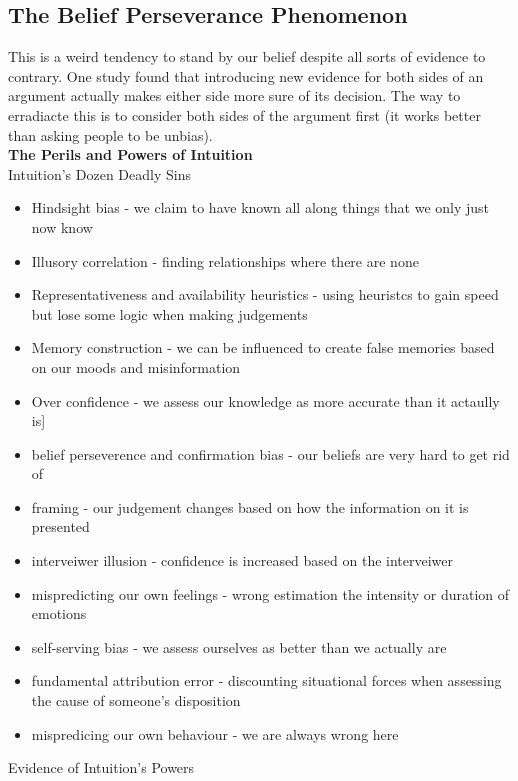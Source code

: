 \documentclass[12pt]{article}
\begin{document}
\subsection*{The Belief Perseverance Phenomenon} This is a weird tendency to stand by our belief despite all sorts of evidence to contrary. One study found that introducing new evidence for both sides of an argument actually makes either side more sure of its decision. The way to erradiacte this is to consider both sides of the argument first (it works better than asking people to be unbias).\\
\textbf{The Perils and Powers of Intuition} \\
Intuition's Dozen Deadly Sins
\begin{itemize}
\item Hindsight bias - we claim to have known all along things that we only just now know
\item Illusory correlation - finding relationships where there are none
\item Representativeness and availability heuristics - using heuristcs to gain speed but lose some logic when making judgements
\item Memory construction - we can be influenced to create false memories based on our moods and misinformation
\item Over confidence - we assess our knowledge as more accurate than it actaully is]
\item belief perseverence and confirmation bias - our beliefs are very hard to get rid of
\item framing - our judgement changes based on how the information on it is presented
\item interveiwer illusion - confidence is increased based on the interveiwer
\item mispredicting our own feelings - wrong estimation the intensity or duration of emotions 
\item self-serving bias - we assess ourselves as better than we actually are
\item fundamental attribution error - discounting situational forces when assessing the cause of someone's disposition
\item mispredicing our own behaviour - we are always wrong here
\end{itemize}
Evidence of Intuition's Powers
\end{document}
